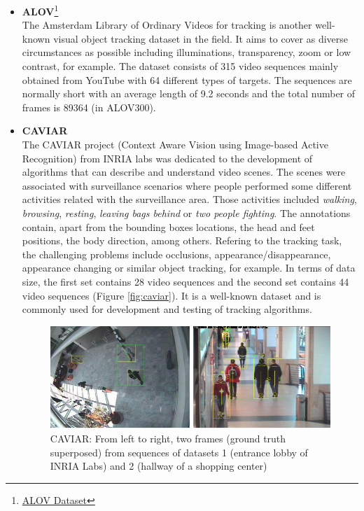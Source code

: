 \begin{itemize}
\begin{figure}[H]
\begin{center}
\label{fig:mot}
\end{center}
\end{figure}
\item \textbf{ALOV}\footnote{{\href{http://alov300pp.joomlafree.it/dataset-resources.html}{ALOV Dataset}}}\\
The Amsterdam Library of Ordinary Videos for tracking is another well-known visual object tracking dataset in the field. It aims to cover as diverse circumstances as possible including illuminations, transparency, zoom or low contrast, for example. The dataset consists of 315 video sequences mainly obtained from YouTube with 64 different types of targets. The sequences are normally short with an average length of 9.2 seconds and the total number of frames is 89364 (in ALOV300).
\item \textbf{CAVIAR} \cite{dubuisson2016survey}\\
The CAVIAR project (Context Aware Vision using Image-based Active Recognition) from INRIA labs was dedicated to the development of algorithms that can describe and understand video scenes. The scenes were associated with surveillance scenarios where people performed some different activities related with the surveillance area. Those activities included \textit{walking}, \textit{browsing}, \textit{resting}, \textit{leaving bags behind} or \textit{two people fighting}. The annotations contain, apart from the bounding boxes locations, the head and feet positions, the body direction, among others. Refering to the tracking task, the challenging problems include occlusions, appearance/disappearance, appearance changing or similar object tracking, for example. In terms of data size, the first set contains 28 video sequences and the second set contains 44 video sequences (Figure \ref{fig:caviar}). It is a well-known dataset and is commonly used for development and testing of tracking algorithms.
\begin{figure}[H]
\begin{center}
\includegraphics[scale=0.3]{caviar.png}
\caption{CAVIAR: From  left  to right, two frames (ground truth superposed) from sequences of datasets 1 (entrance lobby of INRIA Labs) and 2 (hallway of a shopping center) ~\cite{dubuisson2016survey}}

\end{center}
\end{figure}
\end{itemize}
